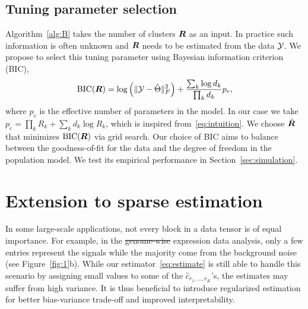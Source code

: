 \documentclass[11pt]{article}
\theoremstyle{plain}
\theoremstyle{definition}
\providecommand{\DIFaddtex}[1]{{\protect\color{blue}\uwave{#1}}} %
\providecommand{\DIFdeltex}[1]{{\protect\color{red}\sout{#1}}}                      %
\providecommand{\DIFaddbegin}{} %
\providecommand{\DIFaddend}{} %
\providecommand{\DIFdelbegin}{} %
\providecommand{\DIFdelend}{} %
\providecommand{\DIFadd}[1]{\texorpdfstring{\DIFaddtex{#1}}{#1}} %
\providecommand{\DIFdel}[1]{\texorpdfstring{\DIFdeltex{#1}}{}} %
\begin{document}
\subsection{Tuning parameter selection}\label{sec:tuning}
\DIFaddbegin \vspace{-.1cm}
\DIFaddend Algorithm~\ref{alg:B} takes the number of clusters $\bm{R}$ as an input. In practice such information is often unknown and $\bm{R}$ needs to be estimated from the data $\mathcal{Y}$. We propose to select this tuning parameter using Bayesian information criterion (BIC), 
\begin{equation}\label{eq:BIC}
\text{BIC}(\bm{R}) =  \log\left(\lVert\mathcal{Y}-\hat \Theta\rVert_F^2\right)+{ \sum_k \log d_k \over \prod_k d_k}p_e,
\end{equation}
where $p_e$ is the effective number of parameters in the model. In our case we take $p_e=\prod_k R_k+\sum_k d_k\log R_k$, which is inspired from~\eqref{eq:intuition}. We choose $\hat {\bm{R}}$ that minimizes $\text{BIC}(\bm{R})$ via grid search. Our choice of BIC aims to balance between the goodness-of-fit for the data and the degree of freedom in the population model. We test its empirical performance in Section~\ref{sec:simulation}.  

\DIFaddbegin \vspace{-.1cm}
\DIFaddend \section{Extension to sparse estimation}\DIFaddbegin \label{block}
\vspace{-.2cm}
\DIFaddend In some large-scale applications, not every block in a data tensor is of equal importance. For example, in the \DIFdelbegin \DIFdel{genome-wise }\DIFdelend \DIFaddbegin \DIFadd{genome-wide }\DIFaddend expression data analysis, only a few entries represent the signals while the majority come from the background noise (see Figure~\ref{fig:1}b). %
While our estimator~\eqref{eq:estimate} is still able to handle this scenario by assigning small values to some of the $\hat c_{r_1,\ldots,r_K}$'s, the estimates may suffer from high variance. It is thus beneficial to introduce regularized estimation for better bias-variance trade-off and improved interpretability. 
\end{document}
